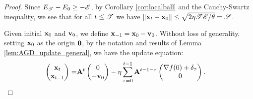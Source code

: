\begin{proof}
Since $E_{\mathscr{T}} - E_0 \ge - \mathscr{E}$, by Corollary \ref{cor:localball} and 
the Cauchy-Swartz inequality, we see that for all $t \le \mathscr{T}$ we have 
$\left\|{\mathbf{x}_t - \mathbf{x}_0}\right\| \le \sqrt{2\eta \mathscr{T} \mathscr{E}/\theta} = \mathscr{S}$.

Given initial $\mathbf{x}_0$ and $\mathbf{v}_0$, we define $\mathbf{x}_{-1} = \mathbf{x}_0 - \mathbf{v}_0$.
Without loss of generality, setting $\mathbf{x}_{0}$ as the origin $\mathbf{0}$, 
by the notation and results of Lemma \ref{lem:AGD_update_general}, 
we have the update equation:
\begin{align} \label{eq:update_AGD_matrix_strongly_convex}
\begin{pmatrix} \mathbf{x}_{t} \\ \mathbf{x}_{t-1} \end{pmatrix}
=& \mathbf{A}^{t}\begin{pmatrix} 0 \\ -\mathbf{v}_0 \end{pmatrix} 
-\eta\sum_{\tau = 0}^{t-1} \mathbf{A}^{t-1-\tau}\begin{pmatrix} \nabla f(0) + \delta_{\tau} \\ 0 \end{pmatrix}.
\end{align}


\end{proof}
